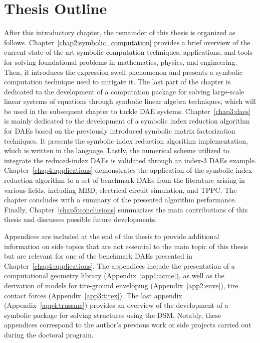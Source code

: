 
\section{Thesis Outline}

After this introductory chapter, the remainder of this thesis is organized as follows. Chapter~\ref{chap2:symbolic_computation} provides a brief overview of the current state-of-the-art symbolic computation techniques, applications, and tools for solving foundational problems in mathematics, physics, and engineering. Then, it introduces the expression swell phenomenon and presents a symbolic computation technique used to mitigate it. The last part of the chapter is dedicated to the development of a computation package for solving large-scale linear systems of equations through symbolic linear algebra techniques, which will be used in the subsequent chapter to tackle \ac{DAE} systems. Chapter~\ref{chap3:daes} is mainly dedicated to the development of a symbolic index reduction algorithm for \acp{DAE} based on the previously introduced symbolic matrix factorization techniques. It presents the symbolic index reduction algorithm implementation, which is written in the \Maple{} language. Lastly, the numerical scheme utilized to integrate the reduced-index \acp{DAE} is validated through an index-3 \acp{DAE} example. Chapter~\ref{chap4:applications} demonstrates the application of the symbolic index reduction algorithm to a set of benchmark \acp{DAE} from the literature arising in various fields, including \ac{MBD}, electrical circuit simulation, and \ac{TPPC}. The chapter concludes with a summary of the presented algorithm performance. Finally, Chapter~\ref{chap5:conclusions} summarizes the main contributions of this thesis and discusses possible future developments.

Appendices are included at the end of the thesis to provide additional information on side topics that are not essential to the main topic of this thesis but are relevant for one of the benchmark \acp{DAE} presented in Chapter~\ref{chap4:applications}. The appendices include the presentation of a \cpp{} computational geometry library (Appendix~\ref{app1:acme}), as well as the derivation of models for tire-ground enveloping (Appendix~\ref{app2:enve}), tire contact forces (Appendix~\ref{app3:tirex}). The last appendix (Appendix~\ref{app4:trussme}) provides an overview of the development of a symbolic package for solving structures using the \ac{DSM}. Notably, these appendices correspond to the author's previous work or side projects carried out during the doctoral program.


